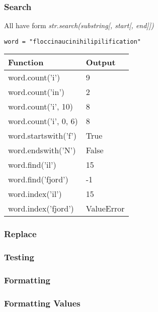 \documentclass{beamer}
\begin{document}
%
%
\begin{frame}
  \frametitle{Search}
  All have form \textit{str.search(substring[, start[, end]])}
  
  \lstinline{word = "floccinaucinihilipilification"}

  \begin{table}
    \begin{tabular}{l | l}
    Function & Output \\
    \hline
    word.count('i') & 9 \\
    word.count('in') & 2 \\
    word.count('i', 10) & 8 \\
    word.count('i', 0, 6) & 8 \\
    \hline
    word.startswith('f') & True \\
    word.endswith('N') & False \\
    \hline
    word.find('il') & 15 \\
    word.find('fjord') & -1 \\
    \hline
    word.index('il') & 15 \\
    word.index('fjord') & ValueError
   \end{tabular}
  \end{table}
\end{frame}


%
%
\begin{frame}
  \frametitle{Replace}
\end{frame}


%
%
\begin{frame}
  \frametitle{Testing}
\end{frame}


%
%
%
\begin{frame}
  \frametitle{Formatting}
\end{frame}

%
%
\begin{frame}
  \frametitle{Formatting Values} 
\end{frame}
\end{document}
